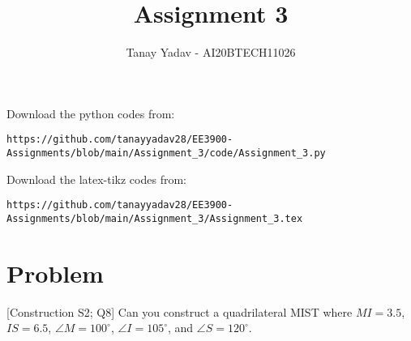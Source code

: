 \documentclass[journal,12pt,twocolumn]{IEEEtran}
\begin{document}
\let\vec\mathbf
\renewcommand{\thefigure}{\theproblem}
\def\putbox#1#2#3{\makebox[0in][l]{\makebox[#1][l]{}\raisebox{\baselineskip}[0in][0in]{\raisebox{#2}[0in][0in]{#3}}}}
     \def\rightbox#1{\makebox[0in][r]{#1}}
     \def\centbox#1{\makebox[0in]{#1}}
     \def\topbox#1{\raisebox{-\baselineskip}[0in][0in]{#1}}
     \def\midbox#1{\raisebox{-0.5\baselineskip}[0in][0in]{#1}}
\vspace{3cm}
\title{Assignment 3}
\author{Tanay Yadav - AI20BTECH11026}
\maketitle
\newpage
\bigskip
\renewcommand{\thefigure}{\theenumi}
\renewcommand{\thetable}{\theenumi}
Download the python codes from: 
%
\begin{lstlisting}
https://github.com/tanayyadav28/EE3900-Assignments/blob/main/Assignment_3/code/Assignment_3.py
\end{lstlisting}
Download the latex-tikz codes from: 
%
\begin{lstlisting}
https://github.com/tanayyadav28/EE3900-Assignments/blob/main/Assignment_3/Assignment_3.tex
\end{lstlisting}
\section{Problem}
[Construction S2; Q8]
Can you construct a quadrilateral MIST where $MI = 3.5$, $IS = 6.5$, $\angle M = 100^{\circ}$, $\angle I = 105^{\circ}$, and $\angle S = 120^{\circ}$.
\end{document}
